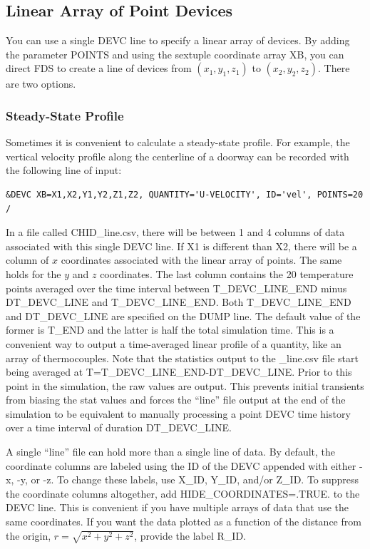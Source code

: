 \documentclass[11pt]{book}
\begin{document}
\subsection{Linear Array of Point Devices}
\label{info:line_file}

You can use a single {\ct DEVC} line to specify a linear array of devices. By adding the parameter {\ct POINTS} and using the sextuple coordinate array {\ct XB}, you can direct FDS to create a line of devices from $(x_1,y_1,z_1)$ to $(x_2,y_2,z_2)$. There are two options.

\subsubsection{Steady-State Profile}

Sometimes it is convenient to calculate a steady-state profile. For example, the vertical velocity profile along the centerline of a doorway can be recorded with the following line of input:
\begin{lstlisting}
&DEVC XB=X1,X2,Y1,Y2,Z1,Z2, QUANTITY='U-VELOCITY', ID='vel', POINTS=20 /
\end{lstlisting}
In a file called {\ct CHID\_line.csv}, there will be between 1 and 4 columns of data associated with this single {\ct DEVC} line. If {\ct X1} is different than {\ct X2}, there will be a column of $x$ coordinates associated with the linear array of points. The same holds for the $y$ and $z$ coordinates. The last column contains the 20 temperature points averaged over the time interval between {\ct T\_DEVC\_LINE\_END} minus {\ct DT\_DEVC\_LINE} and {\ct T\_DEVC\_LINE\_END}. Both {\ct T\_DEVC\_LINE\_END} and {\ct DT\_DEVC\_LINE} are specified on the {\ct DUMP} line. The default value of the former is {\ct T\_END} and the latter is half the total simulation time. This is a convenient way to output a time-averaged linear profile of a quantity, like an array of thermocouples.  Note that the statistics output to the {\ct \_line.csv} file start being averaged at {\ct T=T\_DEVC\_LINE\_END-DT\_DEVC\_LINE}.  Prior to this point in the simulation, the raw values are output.  This prevents initial transients from biasing the stat values and forces the ``line'' file output at the end of the simulation to be equivalent to manually processing a point {\ct DEVC} time history over a time interval of duration {\ct DT\_DEVC\_LINE}.

A single ``line'' file can hold more than a single line of data. By default, the coordinate columns are labeled using the {\ct ID} of the {\ct DEVC} appended with either {\ct -x}, {\ct -y}, or {\ct -z}. To change these labels, use {\ct X\_ID}, {\ct Y\_ID}, and/or {\ct Z\_ID}. To suppress the coordinate columns altogether, add {\ct HIDE\_COORDINATES=.TRUE.} to the {\ct DEVC} line. This is convenient if you have multiple arrays of data that use the same coordinates. If you want the data plotted as a function of the distance from the origin, $r=\sqrt{x^2+y^2+z^2}$, provide the label {\ct R\_ID}.
\end{document}
